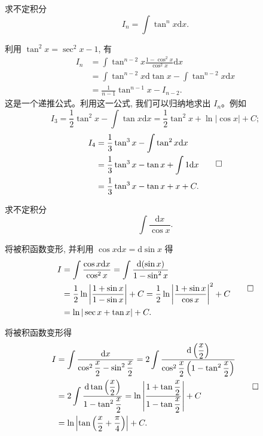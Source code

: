 \begin{example}\label{example:ma-6-2-11}
求不定积分
\[
  I_n=\int\tan^nx\mathrm dx.
\]
\end{example}


\begin{solve}
利用 $\tan^2x=\sec^2x-1$, 有
\[
\begin{aligned}
  I_n
  &=
  \int\tan^{n-2}x\frac{1-\cos^2x}{\cos^2x}\mathrm dx\\
  &=
  \int\tan^{n-2}x\mathrm d\tan x-\int\tan^{n-2}x\mathrm dx\\
  &=
  \frac1{n-1}\tan^{n-1}x-I_{n-2}.
\end{aligned}
\]
这是一个递推公式。利用这一公式, 我们可以归纳地求出 $I_n$。例如
\[
  I_3=\frac12\tan^2x-\int\tan x\mathrm dx
  =
  \frac12\tan^2x+\ln|\cos x|+C;
\]
\[
\begin{aligned}
  I_4
  &=
  \frac13\tan^3x-\int\tan^2x\mathrm dx\\
  &=
  \frac13\tan^3x-\tan x+\int1\mathrm dx\\
  &=
  \frac13\tan^3x-\tan x+x+C.
\end{aligned}
\qedhere
\]
\end{solve}


\begin{example}\label{example:ma-6-2-12}
求不定积分
\[
  \int\frac{\mathrm dx}{\cos x}.
\]
\end{example}


\begin{solve}[{解法 1}]
将被积函数变形, 并利用 $\cos x\mathrm dx=\mathrm d\sin x$ 得
\[
\begin{aligned}
  I
  &=
  \int\frac{\cos x\mathrm dx}{\cos^2x}
  =
  \int\frac{\mathrm d(\sin x)}{1-\sin^2x}\\
  &=
  \frac12\ln\left|\frac{1+\sin x}{1-\sin x}\right|+C
  =
  \frac12\ln\left|\frac{1+\sin x}{\cos x}\right|^2+C\\
  &=
  \ln|\sec x+\tan x|+C.
\end{aligned}
\qedhere
\]
\end{solve}


\begin{solve}[{解法 2}]
将被积函数变形得
\[
\begin{aligned}
  I
  &=
  \int\frac{\mathrm dx}{\cos^2\dfrac x2-\sin^2\dfrac x2}
  =
  2\int\frac{\mathrm d\left(\dfrac x2\right)}
  {\cos^2\dfrac x2\left(1-\tan^2\dfrac x2\right)}\\
  &=
  2\int\frac{\mathrm d\tan\left(\dfrac x2\right)}
  {1-\tan^2\dfrac x2}
  =
  \ln\left|\frac{1+\tan\dfrac x2}{1-\tan\dfrac x2}\right|+C\\
  &=
  \ln\left|\tan\left(\frac x2+\frac\pi4\right)\right|+C.
\end{aligned}
\qedhere
\]
\end{solve}


